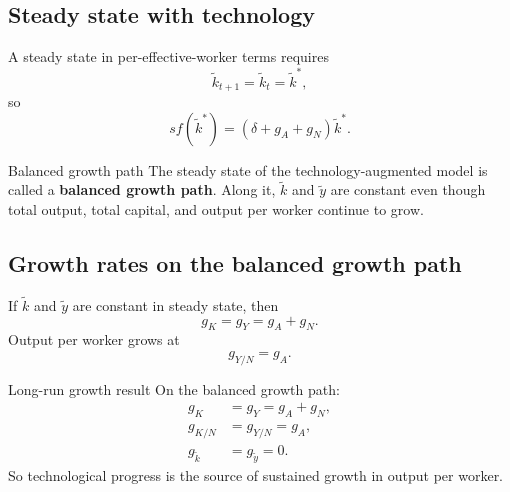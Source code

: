 \documentclass[12pt]{article}
\begin{document}
\subsection{Steady state with technology}

A steady state in per-effective-worker terms requires
\[
\tilde{k}_{t+1}=\tilde{k}_t=\tilde{k}^*,
\]
so
\[
s f(\tilde{k}^*)=(\delta+g_A+g_N)\tilde{k}^*.
\]

\begin{center}
\end{center}

\begin{definition}{Balanced growth path}{}
The steady state of the technology-augmented model is called a \textbf{balanced growth path}. Along it, \(\tilde{k}\) and \(\tilde{y}\) are constant even though total output, total capital, and output per worker continue to grow.
\end{definition}

\subsection{Growth rates on the balanced growth path}

If \(\tilde{k}\) and \(\tilde{y}\) are constant in steady state, then
\[
g_K=g_Y=g_A+g_N.
\]
Output per worker grows at
\[
g_{Y/N}=g_A.
\]

\begin{theorem}{Long-run growth result}{}
On the balanced growth path:
\begin{align*}
g_K &= g_Y = g_A+g_N,\\
g_{K/N} &= g_{Y/N} = g_A,\\
g_{\tilde{k}} &= g_{\tilde{y}} = 0.
\end{align*}
So technological progress is the source of sustained growth in output per worker.
\end{theorem}
\end{document}
